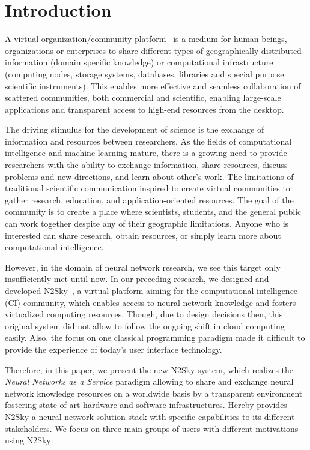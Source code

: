 \documentclass[conference]{IEEEtran}
\begin{document}
\section{Introduction}
\label{sec:introduction}

A virtual organization/community platform~\cite{FoKeTu01} is a medium for human beings, organizations or enterprises to share different types of geographically distributed information (domain specific knowledge) or computational infrastructure (computing nodes, storage systems, databases, libraries and special purpose scientific instruments).
This enables more effective and seamless collaboration of scattered communities, both commercial and scientific, enabling large-scale applications and transparent access to high-end resources from the desktop.

The driving stimulus for the development of science is the exchange of information and resources between researchers.
As the fields of computational intelligence and machine learning mature, there is a growing need to provide
researchers with the ability to exchange information, share resources, discuss
problems and new directions, and learn about other's work. The limitations of
traditional scientific communication inspired to create virtual communities to gather research, education, and application-oriented resources.
The goal of the community is to create a place
where scientists, students, and the general public can work together despite any of
their geographic limitations. Anyone who is interested can share research, obtain
resources, or simply learn more about computational intelligence.

However, in the domain of neural network research, we see this target only insufficiently met until now.
In our preceding research, we designed and developed N2Sky~\cite{N2Sky}, a virtual platform aiming for the computational intelligence (CI) community, which enables access to neural network knowledge and fosters virtualized computing resources. Though, due to design decisions then, this original system did not allow to follow the ongoing shift in cloud computing easily. Also, the focus on one classical programming paradigm made it difficult to provide the experience of today's user interface technology.

Therefore, in this paper, we present the new N2Sky system, which realizes the \emph{Neural Networks as a Service} paradigm allowing to share and exchange neural network knowledge resources on a worldwide basis by a transparent environment fostering state-of-art hardware and software infrastructures.
Hereby provides N2Sky a neural network solution stack with specific capabilities to its different stakeholders. We focus on three main groups of users with different motivations using N2Sky:
\end{document}
